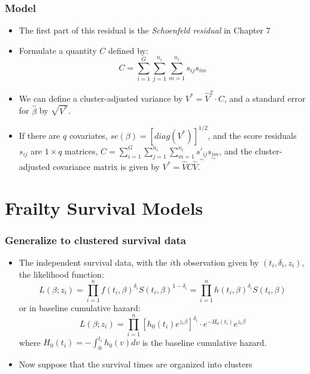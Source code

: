 \documentclass{beamer}
\newcommand{\empr}[1]{{\emph{\color{red}#1}}}
\begin{document}
\pagebreak
\begin{frame}
\frametitle{Model}
\begin{itemize}
\item The first part of this residual is the \empr{Schoenfeld residual} in Chapter 7
\item Formulate a quantity $C$ defined by:
\begin{equation}
C = \sum\limits_{i=1}^{G}\sum\limits_{j=1}^{n_i}\sum\limits_{m=1}^{n_i}s_{ij}s_{im}
\end{equation}
\item We can define a cluster-adjusted variance by $V^{*} = {\hat{V}}^2\cdot C$, and a standard error for $\hat{\beta}$ by $\sqrt{V^{*}}
$.
\item If there are $q$ covariates, $se(\beta) = [diag(V^{*})]^{1/2}$, and the score residuals $s_{ij}$ are $1 \times q$ matrices, $C = \sum\limits_{i=1}^{G}\sum\limits_{j=1}^{n_i}\sum\limits_{m=1}^{n_i}\underset{\sim}{s'_{ij}}\underset{\sim}{s_{im}}$, and the cluster-adjusted covariance matrix is given by $V^{*} = \hat{V}C\hat{V}$.
\end{itemize}
\end{frame}

\section{Frailty Survival Models}
\begin{frame}
\frametitle{Generalize to clustered survival data}
\begin{itemize}
\item The independent survival data, with the $i$th observation given by $(t_i,\delta_i,z_i)$, the likelihood function:
\begin{equation}
L(\beta;z_i) = \prod\limits_{i=1}^{n}f(t_i,\beta)^{\delta_i}S(t_i,\beta)^{1-\delta_i} = \prod\limits_{i=1}^{n}h(t_i,
\beta)^{\delta_i}S(t_i,\beta)
\end{equation}
or in baseline cumulative hazard:
\begin{equation}
L(\beta;z_i) = \prod\limits_{i=1}^{n}[h_0(t_i)e^{z_i\beta}]^{\delta_i}\cdot e^{-H_0(t_i)}e^{z_i\beta}
\end{equation}
where $H_0(t_i) = - \int_{0}^{t_i} h_0(v)dv$ is the baseline cumulative hazard.
\item Now suppose that the survival times are organized into clusters
\end{itemize}
\end{frame}
\end{document}
